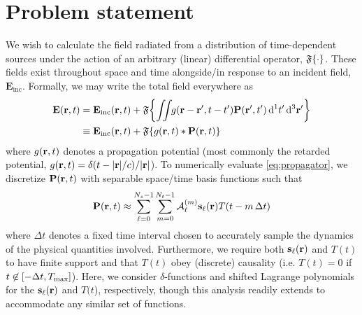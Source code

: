 \section{Problem statement}

We wish to calculate the field radiated from a distribution of time-dependent sources under the action of an arbitrary (linear) differential operator, $\mathfrak{F}\qty{\cdot}$.
These fields exist throughout space and time alongside/in response to an incident field, $\mathbf{E}_\text{inc}$.
Formally, we may write the total field everywhere as
\begin{equation}
  \begin{aligned}
    \vb{E}(\vb{r}, t) & = \vb{E}_\text{inc}(\vb{r}, t) + \mathfrak{F}\qty{\iint_{} \kern0.1emg(\vb{r} - \vb{r}', t - t') \vb{P}(\vb{r}', t') \dd[1]{t'} \dd[3]{\vb{r}'}} \\
                      & \equiv \vb{E}_\text{inc}(\vb{r}, t) + \mathfrak{F}\qty{g(\vb{r}, t) \ast \vb{P}(\vb{r}, t)}
    \end{aligned}
  \label{eq:propagator}
\end{equation}
where $g(\vb{r}, t)$ denotes a propagation potential (most commonly the retarded potential, $g(\vb{r}, t) = \delta(t - \abs{\vb{r}}/c)/\abs{\vb{r}}$).
To numerically evaluate \cref{eq:propagator}, we discretize $\vb{P}(\vb{r}, t)$ with separable space/time basis functions such that 
\begin{equation}
  \vb{P}(\vb{r}, t) \approx \sum_{\ell = 0}^{N_s - 1} \sum_{m = 0}^{N_t - 1} \mathcal{A}_\ell^{(m)} \vb{s}_\ell(\vb{r}) T(t - m \, \Delta t)
  \label{eq:discretization}
\end{equation}
where $\Delta t$ denotes a fixed time interval chosen to accurately sample the dynamics of the physical quantities involved.
Furthermore, we require both $\vb{s}_\ell(\vb{r})$ and $T(t)$ to have finite support and that $T(t)$ obey (discrete) causality (i.e. $T(t) = 0$ if $t \not \in \qty[-\Delta t, T_\text{max}]$).
Here, we consider $\delta$-functions and shifted Lagrange polynomials for the $\vb{s}_\ell(\vb{r})$ and $T(t$), respectively, though this analysis readily extends to accommodate any similar set of functions.

